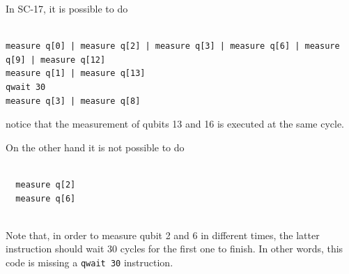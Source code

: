\begin{minipage}[t]{.3\textwidth}

In SC-17, it is possible to do

\begin{verbatim}
  
measure q[0] | measure q[2] | measure q[3] | measure q[6] | measure q[9] | measure q[12]
measure q[1] | measure q[13]
qwait 30
measure q[3] | measure q[8]

\end{verbatim}

notice that the measurement of qubits 13 and 16 is executed at the same cycle.     

\end{minipage}
\hfill %
\begin{minipage}[t]{.3\textwidth}

On the other hand it is not possible to do

\begin{verbatim}
  
  measure q[2]
  measure q[6]
  
\end{verbatim}

Note that, in order to measure qubit 2 and 6 in different times, the latter instruction should wait 30 cycles for the first one to finish. In other words, this code is missing a \texttt{qwait 30} instruction.

\end{minipage}
